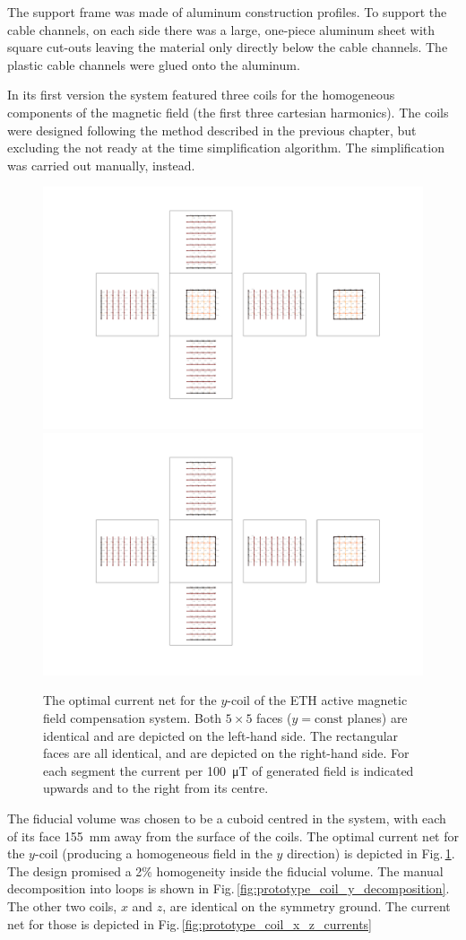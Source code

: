 The support frame was made of aluminum construction profiles. To support the cable channels, on each side there was a large, one-piece aluminum sheet with square cut-outs leaving the material only directly below the cable channels. The plastic cable channels were glued onto the aluminum.

In its first version the system featured three coils for the homogeneous components of the magnetic field (the first three cartesian harmonics). The coils were designed following the method described in the previous chapter, but excluding the not ready at the time simplification algorithm. The simplification was carried out manually, instead.

\begin{figure}
  \centering
  \includegraphics[height=0.3\linewidth]{gfx/prototype/coil_design_y_100uT_1.pdf}
  \quad\quad
  \includegraphics[height=0.3\linewidth]{gfx/prototype/coil_design_y_100uT_2.pdf}
  \caption{The optimal current net for the $y$-coil of the ETH active magnetic field compensation system. Both $5 \times 5$ faces ($y = \mathrm{const}$ planes) are identical and are depicted on the left-hand side. The rectangular faces are all identical, and are depicted on the right-hand side. For each segment the current per \SI{100}{\micro\tesla} of generated field is indicated upwards and to the right from its centre.}
  \label{fig:prototype_coil_y_currents}
\end{figure}

The fiducial volume was chosen to be a cuboid centred in the system, with each of its face \SI{155}{\milli\meter} away from the surface of the coils. The optimal current net for the $y$-coil (producing a homogeneous field in the $y$ direction) is depicted in Fig.\,\ref{fig:prototype_coil_y_currents}. The design promised a 2\% homogeneity inside the fiducial volume. The manual decomposition into loops is shown in Fig.\,\ref{fig:prototype_coil_y_decomposition}. The other two coils, $x$ and $z$, are identical on the symmetry ground. The current net for those is depicted in Fig.\,\ref{fig:prototype_coil_x_z_currents}

